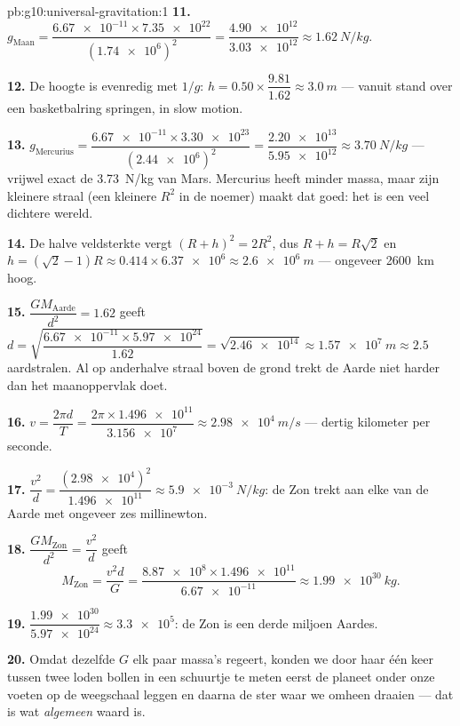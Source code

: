 \begin{solution}{pb:g10:universal-gravitation:1}
\textbf{11.} $g_{\text{Maan}} = \dfrac{\num{6.67e-11} \times
\num{7.35e22}}{(\num{1.74e6})^2} = \dfrac{\num{4.90e12}}
{\num{3.03e12}} \approx \qty{1.62}{N/kg}$.

\textbf{12.} De hoogte is evenredig met $1/g$:
$h = 0.50 \times \dfrac{9.81}{1.62} \approx \qty{3.0}{m}$ --- vanuit
stand over een basketbalring springen, in slow motion.

\textbf{13.} $g_{\text{Mercurius}} = \dfrac{\num{6.67e-11} \times
\num{3.30e23}}{(\num{2.44e6})^2} = \dfrac{\num{2.20e13}}
{\num{5.95e12}} \approx \qty{3.70}{N/kg}$ --- vrijwel exact de
\qty{3.73}{N/kg} van Mars. Mercurius heeft minder massa, maar zijn
kleinere straal (een kleinere $R^2$ in de noemer) maakt dat goed: het is
een veel dichtere wereld.

\textbf{14.} De halve veldsterkte vergt $(R + h)^2 = 2 R^2$, dus
$R + h = R\sqrt{2}$ en
$h = (\sqrt{2} - 1) R \approx 0.414 \times \num{6.37e6}
\approx \qty{2.6e6}{m}$ --- ongeveer \qty{2600}{km} hoog.

\textbf{15.} $\dfrac{G M_{\text{Aarde}}}{d^2} = 1.62$ geeft
$d = \sqrt{\dfrac{\num{6.67e-11} \times \num{5.97e24}}{1.62}}
= \sqrt{\num{2.46e14}} \approx \qty{1.57e7}{m} \approx 2.5$
aardstralen. Al op anderhalve straal boven de grond trekt de Aarde niet
harder dan het maanoppervlak doet.

\textbf{16.} $v = \dfrac{2\pi d}{T}
= \dfrac{2\pi \times \num{1.496e11}}{\num{3.156e7}}
\approx \qty{2.98e4}{m/s}$ --- dertig kilometer per seconde.

\textbf{17.} $\dfrac{v^2}{d} = \dfrac{(\num{2.98e4})^2}{\num{1.496e11}}
\approx \qty{5.9e-3}{N/kg}$: de Zon trekt aan elke  van de
Aarde met ongeveer zes millinewton.

\textbf{18.} $\dfrac{G M_{\text{Zon}}}{d^2} = \dfrac{v^2}{d}$ geeft
\[
M_{\text{Zon}} = \frac{v^2 d}{G}
= \frac{\num{8.87e8} \times \num{1.496e11}}{\num{6.67e-11}}
\approx \qty{1.99e30}{kg}.
\]

\textbf{19.} $\dfrac{\num{1.99e30}}{\num{5.97e24}} \approx
\num{3.3e5}$: de Zon is een derde miljoen Aardes.

\textbf{20.} Omdat dezelfde $G$ elk paar massa's regeert, konden we door
haar één keer tussen twee loden bollen in een schuurtje te meten eerst
de planeet onder onze voeten op de weegschaal leggen en daarna de ster
waar we omheen draaien --- dat is wat \emph{algemeen} waard is.
\end{solution}
